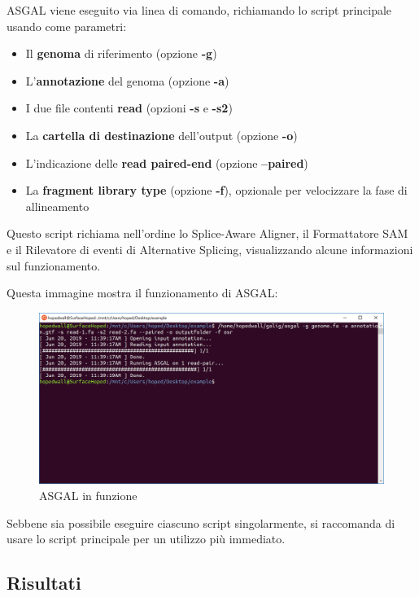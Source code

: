 ASGAL viene eseguito via linea di comando, richiamando lo script principale usando come parametri:

\begin{itemize}
	\item Il \textbf{genoma} di riferimento (opzione \textbf{-g})
	\item L'\textbf{annotazione} del genoma (opzione \textbf{-a})
	\item I due file contenti \textbf{read} (opzioni \textbf{-s} e \textbf{-s2})
	\item La \textbf{cartella di destinazione} dell'output (opzione \textbf{-o})
	\item L'indicazione delle \textbf{read paired-end} (opzione \textbf{--paired})
	\item La \textbf{fragment library type} (opzione \textbf{-f}), opzionale per velocizzare la fase di allineamento
\end{itemize}

Questo script richiama nell'ordine lo Splice-Aware Aligner, il Formattatore SAM e il Rilevatore di eventi di Alternative Splicing, visualizzando alcune informazioni sul funzionamento.

Questa immagine mostra il funzionamento di ASGAL:

\begin{figure}[h]
	\centering
	\includegraphics[width=\linewidth]{images/prompt.png}
  \caption{ASGAL in funzione}
  \label{fig:ASGALPrompt}
\end{figure}

Sebbene sia possibile eseguire ciascuno script singolarmente, si raccomanda di usare lo script principale per un utilizzo più immediato. 

\newpage

\subsection{Risultati}

